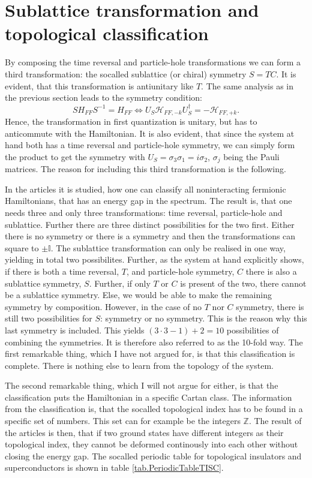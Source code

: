 \section{Sublattice transformation and topological classification}
By composing the time reversal and particle-hole transformations we can form a third transformation: the socalled sublattice (or chiral) symmetry $S = TC$. It is evident, that this transformation is antiunitary like $T$. The same analysis as in the previous section leads to the symmetry condition:
\begin{equation}
SH_{FF}S^{-1} = H_{FF} \Leftrightarrow U_S\mathcal{H}_{FF,-k} U^\dagger_S = - \mathcal{H}_{FF,+k}.
\end{equation}
Hence, the transformation in first quantization is unitary, but has to anticommute with the Hamiltonian. It is also evident, that since the system at hand both has a time reversal and particle-hole symmetry, we can simply form the product to get the symmetry with $U_S = \sigma_3\sigma_1 = i\sigma_2$, $\sigma_j$ being the Pauli matrices. The reason for including this third transformation is the following. 

In the articles \cite{Ludwig.Topology, Chiu.Topology} it is studied, how one can classify all noninteracting fermionic Hamiltonians, that has an energy gap in the spectrum. The result is, that one needs three and only three transformations: time reversal, particle-hole and sublattice. Further there are three distinct possibilities for the two first. Either there is no symmetry or there is a symmetry and then the transformations can square to $\pm \mathbb{I}$. The sublattice transformation can only be realised in one way, yielding in total two possibilites. Further, as the system at hand explicitly shows, if there is both a time reversal, $T$, and particle-hole symmetry, $C$ there is also a sublattice symmetry, $S$. Further, if only $T$ or $C$ is present of the two, there cannot be a sublattice symmetry. Else, we would be able to make the remaining symmetry by composition. However, in the case of no $T$ nor $C$ symmetry, there is still two possibilities for $S$: symmetry or no symmetry. This is the reason why this last symmetry is included. This yields $(3\cdot 3 - 1) + 2 = 10$ possibilities of combining the symmetries. It is therefore also referred to as the 10-fold way. The first remarkable thing, which I have not argued for, is that this classification is complete. There is nothing else to learn from the topology of the system. 

The second remarkable thing, which I will not argue for either, is that the classification puts the Hamiltonian in a specific Cartan class. The information from the classification is, that the socalled topological index has to be found in a specific set of numbers. This set can for example be the integers $\mathbb{Z}$. The result of the articles is then, that if two ground states have different integers as their topological index, they cannot be deformed continously into each other without closing the energy gap. The socalled periodic table for topological insulators and superconductors is shown in table \ref{tab.PeriodicTableTISC}.

